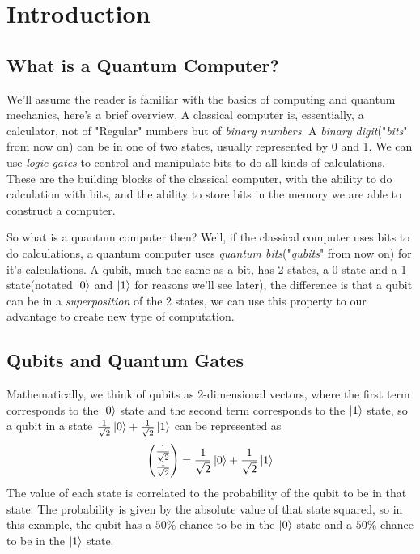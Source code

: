 \documentclass[english, a4paper, 12pt, twoside]{article}
\numberwithin{equation}{section} %
\begin{document}
\section{Introduction}
\subsection{What is a Quantum Computer?}
We'll assume the reader is familiar with the basics of computing and quantum mechanics, here's a brief overview. \newline
 A classical computer is, essentially, a calculator, not of "Regular" numbers but of \textit{binary numbers}. %
 A \textit{binary digit}("\textit{bits}" from now on) can be in one of two states, usually represented by 0 and 1. We can use \textit{logic gates} to control and manipulate bits to do all kinds of calculations. These are the building blocks of the classical computer, with the ability to do calculation with bits, and the ability to store bits in the memory we are able to construct a computer.
 
So what is a quantum computer then? Well, if the classical computer uses bits to do calculations, a quantum computer uses \textit{quantum bits}("\textit{qubits}" from now on) for it's calculations. A qubit, much the same as a bit, has 2 states, a 0 state and a 1 state(notated $\ket{0}$ and $\ket{1}$ for reasons we'll see later), the difference is that a qubit can be in a \textit{superposition} of the 2 states, we can use this property to our advantage to create new type of computation.

\subsection{Qubits and Quantum Gates}
Mathematically, we think of qubits as 2-dimensional vectors, where the first term corresponds to the $\ket{0}$ state and the second term corresponds to the $\ket{1}$ state, so a qubit in a state $\frac{1}{\sqrt{2}} \ket{0} + \frac{1}{\sqrt{2}} \ket{1}$ can be represented as
\[
\begin{pmatrix}
    \frac{1}{\sqrt{2}} \\
    \frac{1}{\sqrt{2}} 
\end{pmatrix} = \frac{1}{\sqrt{2}} \ket{0} + \frac{1}{\sqrt{2}} \ket{1}
\]
The value of each state is correlated to the probability of the qubit to be in that state. The probability is given by the absolute value of that state squared, so in this example, the qubit has a $50\%$ chance to be in the $\ket{0}$ state and a $50\%$ chance to be in the $\ket{1}$ state.
\end{document}

